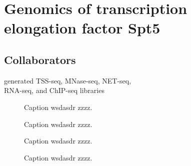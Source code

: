 \chapter{Genomics of transcription elongation factor Spt5}

\section{Collaborators}

\begin{description}[align=right, leftmargin=!, labelwidth=5cm, noitemsep]
    \item [Ameet Shetty] generated TSS-seq, MNase-seq, NET-seq,\\RNA-seq, and ChIP-seq libraries
\end{description}

\begin{figure}
    \caption[Diagram of the dual-shutoff system used to deplete Spt5 from \textit{S. pombe}]{Caption wsdasdr zzzz.}
\end{figure}

\begin{figure}
\caption[Average Spt5 ChIP-seq, RNAPII ChIP-seq, and sense NET-seq signal over non-overlapping coding genes, from Spt5 depleted and non-depleted cells.]{Caption wsdasdr zzzz.}
\end{figure}

\begin{figure}
\caption[Enrichment of RNAPII phospho-serine 5 and phospho-serine 2 over non-overlapping coding genes, in Spt5 depleted and non-depleted cells.]{Caption wsdasdr zzzz.}
\end{figure}

\begin{figure}
\caption[Heatmaps of antisense RNA-seq signal from Spt5 depleted and non-depleted cells, over non-overlapping coding genes.]{Caption wsdasdr zzzz.}
\end{figure}


\newpage

\begingroup
\singlespacing

\endgroup
